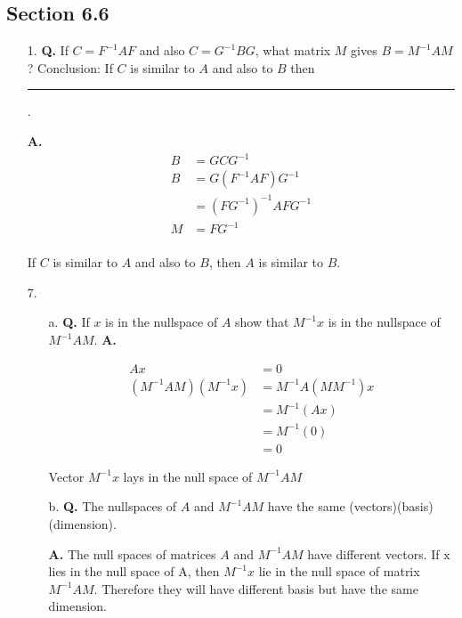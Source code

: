 \documentclass[main.tex]{subfiles}
\begin{document}
\subsection{Section 6.6}
\begin{enumerate}
    \item [1.] \textbf{Q.} If $C=F^{-1} A F$ and also $C=G^{-1} B G$, what matrix $M$ gives $B=M^{-1} A M$ ? Conclusion: If $C$ is similar to $A$ and also to $B$ then \rule{1cm}{0.15mm}.

    \textbf{A.} 
    $$
    \begin{aligned}
    B &=G C G^{-1}\\
    B &=G\left(F^{-1} A F\right) G^{-1} \\
    &=\left(F G^{-1}\right)^{-1} A F G^{-1}\\
    M&=F G^{-1}\\
    \end{aligned}
    $$

    If $C$ is similar to $A$ and also to $B$, then $A$ is similar to $B$.
    
    \item [7.]
    \begin{enumerate}
        \item [a.] \textbf{Q.} If $x$ is in the nullspace of $A$ show that $M^{-1} x$ is in the nullspace of $M^{-1} A M$. \textbf{A.}

        $$
        \begin{aligned}
        A x &=0\\
        \left(M^{-1} A M\right)\left(M^{-1} x\right) &=M^{-1} A\left(M M^{-1}\right) x \\
        &=M^{-1}(A x) \\
        &=M^{-1}(0) \\
        &=0
        \end{aligned}
        $$

        Vector $M^{-1} x$ lays in the null space of $M^{-1} A M$

        \item [b.] \textbf{Q.} The nullspaces of $A$ and $M^{-1} A M$ have the same (vectors)(basis)(dimension). 
        
        \textbf{A.} The null spaces of matrices $A$ and $M^{-1} A M$ have different vectors. If $\mathrm{x}$ lies in the null space of A, then $M^{-1} x$ lie in the null space of matrix $M^{-1} A M$. Therefore they will have different basis but have the same dimension.
        
        
    \end{enumerate}
    
\end{enumerate}
\end{document}

